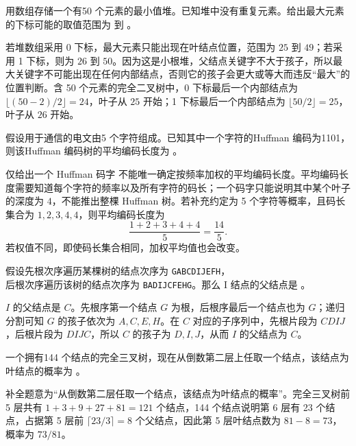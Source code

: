 \begin{question}
用数组存储一个有50 个元素的最小值堆。已知堆中没有重复元素。给出最大元素的下标可能的取值范围为 \blank 到 \blank 。\\
\begin{solution}
若堆数组采用 0 下标，最大元素只能出现在叶结点位置，范围为 $25$ 到 $49$；若采用 1 下标，则为 $26$ 到 $50$。因为这是小根堆，父结点关键字不大于孩子，所以最大关键字不可能出现在任何内部结点，否则它的孩子会更大或等大而违反“最大”的位置判断。含 50 个元素的完全二叉树中，0 下标最后一个内部结点为 $\lfloor(50-2)/2\rfloor=24$，叶子从 $25$ 开始；1 下标最后一个内部结点为 $\lfloor50/2\rfloor=25$，叶子从 $26$ 开始。
\end{solution}
\end{question}

\begin{question}
假设用于通信的电文由5 个字符组成。已知其中一个字符的Huffman 编码为1101，则该Huffman 编码树的平均编码长度为 \blank 。\\
\begin{solution}
仅给出一个 Huffman 码字 \texttt{} 不能唯一确定按频率加权的平均编码长度。平均编码长度需要知道每个字符的频率以及所有字符的码长；一个码字只能说明其中某个叶子的深度为 $4$，不能推出整棵 Huffman 树。若补充约定为 5 个字符等概率，且码长集合为 $1,2,3,4,4$，则平均编码长度为
\[
\frac{1+2+3+4+4}{5}=\frac{14}{5}.
\]
若权值不同，即使码长集合相同，加权平均值也会改变。
\end{solution}
\end{question}

\begin{question}
假设先根次序遍历某棵树的结点次序为 \texttt{GABCDIJEFH}，\\
后根次序遍历该树的结点次序为 \texttt{BADIJCFEHG}。那么 I 结点的父结点是 \blank 。\\
\begin{solution}
$I$ 的父结点是 $C$。先根序第一个结点 $G$ 为根，后根序最后一个结点也为 $G$；递归分割可知 $G$ 的孩子依次为 $A,C,E,H$。在 $C$ 对应的子序列中，先根片段为 $CDIJ$，后根片段为 $DIJC$，所以 $C$ 的孩子为 $D,I,J$，从而 $I$ 的父结点为 $C$。
\end{solution}
\end{question}

\begin{question}
一个拥有144 个结点的完全三叉树，现在从倒数第二层上任取一个结点，该结点为叶结点的概率为 \blank 。\\
\begin{solution}
补全题意为“从倒数第二层任取一个结点，该结点为叶结点的概率”。完全三叉树前 5 层共有 $1+3+9+27+81=121$ 个结点，144 个结点说明第 6 层有 23 个结点，占据第 5 层前 $\lceil23/3\rceil=8$ 个父结点，因此第 5 层叶结点数为 $81-8=73$，概率为 $73/81$。
\end{solution}
\end{question}

